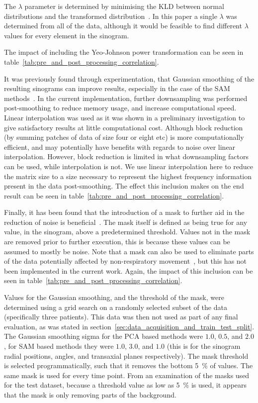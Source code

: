         The $\lambda$ parameter is determined by minimising the \gls{KLD} between normal distributions and the transformed distribution~\parencite{Yeo2000ASymmetry}. In this paper a single $\lambda$ was determined from all of the data, although it would be feasible to find different $\lambda$ values for every element in the sinogram.

        The impact of including the Yeo-Johnson power transformation can be seen in table~\ref{tab:pre_and_post_processing_correlation}.
        
        It was previously found through experimentation, that Gaussian smoothing of the resulting sinograms can improve results, especially in the case of the \gls{SAM} methods~\parencite{Thielemans2013ComparisonData}. In the current implementation, further downsampling was performed post-smoothing to reduce memory usage, and increase computational speed. Linear interpolation was used as it was shown in a preliminary investigation to give satisfactory results at little computational cost. Although block reduction (by summing patches of data of size four or eight etc) is more computationally efficient, and may potentially have benefits with regards to noise over linear interpolation. However, block reduction is limited in what downsampling factors can be used, while interpolation is not. We use linear interpolation here to reduce the matrix size to a size necessary to represent the highest frequency information present in the data post-smoothing. The effect this inclusion makes on the end result can be seen in table~\ref{tab:pre_and_post_processing_correlation}.
        
        Finally, it has been found that the introduction of a mask to further aid in the reduction of noise is beneficial~\parencite{Thielemans2011}. The mask itself is defined as being true for any value, in the sinogram, above a predetermined threshold. Values not in the mask are removed prior to further execution, this is because these values can be assumed to mostly be noise. Note that a mask can also be used to eliminate parts of the data potentially affected by non-respiratory movement~\parencite{Bertolli2018Data-DrivenTomography}, but this has not been implemented in the current work. Again, the impact of this inclusion can be seen in table~\ref{tab:pre_and_post_processing_correlation}.

        Values for the Gaussian smoothing, and the threshold of the mask, were determined using a grid search on a randomly selected subset of the data (specifically three patients). This data was then not used as part of any final evaluation, as was stated in section~\ref{sec:data_acquisition_and_train_test_split}. The Gaussian smoothing sigma for the \gls{PCA} based methods were $1.0$, $0.5$, and $2.0$, for \gls{SAM} based methods they were $1.0$, $3.0$, and $1.0$ (this is for the sinogram radial positions, angles, and transaxial planes respectively). The mask threshold is selected programmatically, such that it removes the bottom \SI{5}{\percent} of values. The same mask is used for every time point. From an examination of the masks used for the test dataset, because a threshold value as low as \SI{5}{\percent} is used, it appears that the mask is only removing parts of the background.

